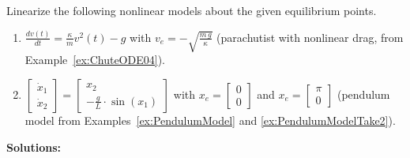  \begin{example} 
\label{ex:linearizeAboutEquilibriumPoints}
Linearize the following nonlinear models about the given equilibrium points. 
 \begin{enumerate}
\renewcommand{\labelenumi}{(\alph{enumi})}
\setlength{\itemsep}{.2cm}
    \item $\frac{dv(t)}{dt} =   \frac{\kappa}{m} v^2(t) - g$ with $v_e = -\sqrt{ \frac{m\,g}{\kappa} }$ (parachutist with nonlinear drag, from Example~\ref{ex:ChuteODE04}).
    
    \item $\left[ \begin{array}{c} \dot{x}_1 \\ \dot{x}_2 \end{array} \right]= \left[\begin{array}{c} x_2 \\  -\frac{g}{L}  \cdot \sin(x_1)\end{array} \right]$ with $x_e = \left[ \begin{array}{c} 0\\ 0 \end{array} \right]$ and $x_e = \left[ \begin{array}{c} \pi \\ 0 \end{array} \right]$ (pendulum model from Examples~\ref{ex:PendulumModel} and \ref{ex:PendulumModelTake2}).

\end{enumerate} 
\end{example}
\textbf{Solutions:}
